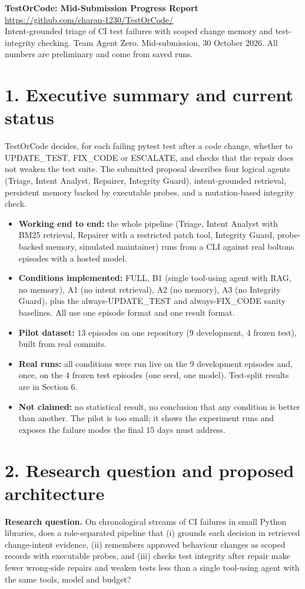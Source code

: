 \documentclass[10pt,a4paper]{article}
\begin{document}
\begin{center}{\LARGE\bfseries TestOrCode: Mid-Submission Progress Report}\\[4pt]\url{https://github.com/charan-1230/TestOrCode/}\\[4pt]Intent-grounded triage of CI test failures with scoped change memory and test-integrity checking. Team Agent Zero. Mid-submission, 30 October 2026. All numbers are preliminary and come from saved runs.\end{center}
\section*{1. Executive summary and current status}
TestOrCode decides, for each failing pytest test after a code change, whether to UPDATE\_TEST, FIX\_CODE or ESCALATE, and checks that the repair does not weaken the test suite. The submitted proposal describes four logical agents (Triage, Intent Analyst, Repairer, Integrity Guard), intent-grounded retrieval, persistent memory backed by executable probes, and a mutation-based integrity check.

\begin{itemize}
\item \textbf{Working end to end:} the whole pipeline (Triage, Intent Analyst with BM25 retrieval, Repairer with a restricted patch tool, Integrity Guard, probe-backed memory, simulated maintainer) runs from a CLI against real boltons episodes with a hosted model.
\item \textbf{Conditions implemented:} FULL, B1 (single tool-using agent with RAG, no memory), A1 (no intent retrieval), A2 (no memory), A3 (no Integrity Guard), plus the always-UPDATE\_TEST and always-FIX\_CODE sanity baselines. All use one episode format and one result format.
\item \textbf{Pilot dataset:} 13 episodes on one repository (9 development, 4 frozen test), built from real commits.
\item \textbf{Real runs:} all conditions were run live on the 9 development episodes and, once, on the 4 frozen test episodes (one seed, one model). Test-split results are in Section 6.
\item \textbf{Not claimed:} no statistical result, no conclusion that any condition is better than another. The pilot is too small; it shows the experiment runs and exposes the failure modes the final 15 days must address.
\end{itemize}
\section*{2. Research question and proposed architecture}
\textbf{Research question.} On chronological streams of CI failures in small Python libraries, does a role-separated pipeline that (i) grounds each decision in retrieved change-intent evidence, (ii) remembers approved behaviour changes as scoped records with executable probes, and (iii) checks test integrity after repair make fewer wrong-side repairs and weaken tests less than a single tool-using agent with the same tools, model and budget?
\end{document}
